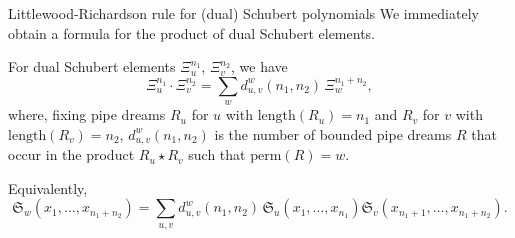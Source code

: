 \documentclass[aspectratio=169]{beamer}
\newcommand{\coma}{\mathbf{S}}
\newcommand{\dcoma}{\mathcal{DS}}
\newcommand{\Sch}[1]{\Xi_{#1}}
\newcommand{\sch}{\mathfrak{S}}
\newcommand{\RC}{\mathrm{Pipe}}
\newcommand{\hr}{\mathrm{length}}
\begin{document}

\begin{frame}{Littlewood-Richardson rule for (dual) Schubert polynomials}
We immediately obtain a formula for the product of dual Schubert elements.

\begin{theorem}[S, 2026+]
For dual Schubert elements $\Sch{u}^{n_1}$, $\Sch{v}^{n_2}$, we have
\[
\Sch{u}^{n_1}\cdot \Sch{v}^{n_2}
=
\sum_{w} d_{u,v}^{w}(n_1, n_2)\,\Sch{w}^{n_1 + n_2},
\]
where, fixing pipe dreams $R_u$ for $u$ with $\hr(R_u) = n_1$ and $R_v$ for $v$ with $\hr(R_v) = n_2$, $d_{u,v}^{w}(n_1, n_2)$ is the number of bounded pipe dreams $R$ that occur in the product $R_u\star R_v$ such that $\mathrm{perm}(R) = w$.

Equivalently,
$$\sch_w(x_1,\ldots,x_{n_1+n_2}) = \sum_{u,v} d_{u,v}^{w}(n_1, n_2)\,\sch_u(x_1,\ldots,x_{n_1})\sch_v(x_{n_1+1},\ldots,x_{n_1+n_2}).$$
\end{theorem}

\end{frame}
\end{document}
